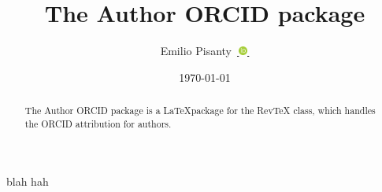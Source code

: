 \documentclass[%
  twoside,
  reprint,
  amsmath,amssymb,
  aps,
  pra,
  nofootinbib,
  showpacs,
  superscriptaddress,
  a4paper,
]{revtex4-1}
\newcommand{\orcid}[1]{%
  \href{%
    https://orcid.org/#1%
  }{%
   \,\protect\includegraphics[width=8pt]{ORCID-icon.png}\,%
  }%
}
\begin{document}
\title{The Author ORCID package}


\author{Emilio Pisanty\,\orcid{0000-0003-0598-8524}}


\date{\today}



\begin{abstract}
The Author ORCID package is a \LaTeX package for the RevTeX class, which handles the ORCID attribution for authors.
\end{abstract}

\maketitle

{\color{gray}
\lipsum[1]
}

\examplecommand


\def\svgwidth{60pt}


blah hah

%


\end{document}
